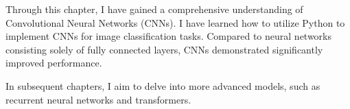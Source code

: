 Through this chapter, I have gained a comprehensive understanding of Convolutional Neural Networks (CNNs). I have learned how to utilize Python to implement CNNs for image classification tasks. Compared to neural networks consisting solely of fully connected layers, CNNs demonstrated significantly improved performance.

In subsequent chapters, I aim to delve into more advanced models, such as recurrent neural networks and transformers.